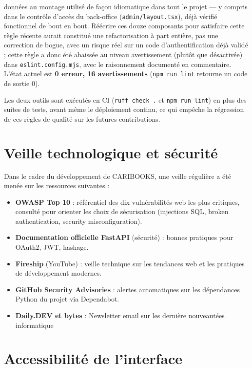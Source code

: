 \documentclass[12pt, a4paper]{report}
\renewcommand{\_}{\origunderscore\allowbreak}
\begin{document}
\begin{itemize}
    données au montage \fg{} utilisé de façon idiomatique dans tout le projet — y compris dans le
    contrôle d'accès du back-office (\texttt{admin/layout.tsx}), déjà vérifié fonctionnel de bout en
    bout. Réécrire ces douze composants pour satisfaire cette règle récente aurait constitué une
    refactorisation à part entière, pas une correction de bogue, avec un risque réel sur un code
    d'authentification déjà validé ; cette règle a donc été abaissée au niveau avertissement
    (plutôt que désactivée) dans \texttt{eslint.config.mjs}, avec le raisonnement documenté en
    commentaire. L'état actuel est \textbf{0 erreur, 16 avertissements} (\texttt{npm run lint}
    retourne un code de sortie 0).
\end{itemize}

\noindent Les deux outils sont exécutés en CI (\texttt{ruff check .} et \texttt{npm run lint}) en
plus des suites de tests, avant même le déploiement continu, ce qui empêche la régression de ces
règles de qualité sur les futures contributions.

\section{Veille technologique et sécurité}

Dans le cadre du développement de CARIBOOKS, une veille régulière a été menée sur les ressources suivantes :
\begin{itemize}
    \item \textbf{OWASP Top 10} : référentiel des dix vulnérabilités web les plus critiques, consulté pour orienter les choix de sécurisation (injections SQL, broken authentication, security misconfiguration).
    \item \textbf{Documentation officielle FastAPI} (sécurité) : bonnes pratiques pour OAuth2, JWT, hashage.
    \item \textbf{Fireship} (YouTube) : veille technique sur les tendances web et les pratiques de développement modernes.
    \item \textbf{GitHub Security Advisories} : alertes automatiques sur les dépendances Python du projet via Dependabot.
    \item \textbf{Daily.DEV et bytes} :
    Newsletter email sur les dernière nouveautées informatique
\end{itemize}

\section{Accessibilité de l'interface}
\end{document}
